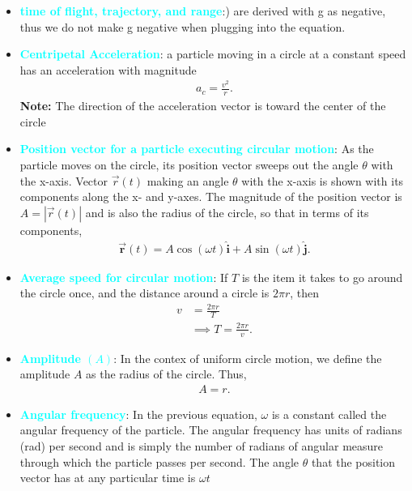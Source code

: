 \documentclass{report}
\begin{document}
\begin{itemize}
            \item \textbf{\textcolor{cyan}{time of flight, trajectory, and range}}:) are derived with g as negative, thus we do not make g negative when plugging into the equation. 
            \item \textbf{\textcolor{cyan}{Centripetal Acceleration}}: a particle moving in a circle at a constant speed has an acceleration with magnitude
                \begin{align*}
                    a_{c} = \frac{v^{2}}{r}
                .\end{align*}
                \textbf{Note:} The direction of the acceleration vector is toward the center of the circle
            \item \textbf{\textcolor{cyan}{Position vector for a particle executing circular motion}}:
                As the particle moves on the circle, its position vector sweeps out the angle $\theta$ with the x-axis. Vector $\vec{r}(t)$ making an angle $\theta$ with the x-axis is shown with its components along the x- and y-axes. The magnitude of the position vector is $A=|\vec{r}(t)|$ and is also the radius of the circle, so that in terms of its components,
                \begin{align*}
                    \vec{\mathbf{r}}(t) = A\cos(\omega t)\hat{\mathbf{i}} + A\sin(\omega t)\hat{\mathbf{j}}
                .\end{align*}
            \item \textbf{\textcolor{cyan}{Average speed for circular motion}}: If $T$ is the item it takes to go around the circle once, and the distance around a circle is $2\pi r$, then 
                \begin{align*}
                    v &= \frac{2\pi r}{T} \\
                      &\implies T = \frac{2\pi r}{v}
                .\end{align*}
            \item \textbf{\textcolor{cyan}{Amplitude $(A)$}}: In the contex of uniform circle motion, we define the amplitude $A$ as the radius of the circle. Thus,
                \begin{align*}
                    A = r
                .\end{align*}
            \item \textbf{\textcolor{cyan}{Angular frequency}}: In the previous equation, $\omega$ is a constant called the angular frequency of the particle.
                \bigbreak \noindent 
                The angular frequency has units of radians (rad) per second and is simply the number of radians of angular measure through which the particle passes per second. The angle  $\theta$ that the position vector has at any particular time is  $\omega t$

\end{itemize}
\end{document}
